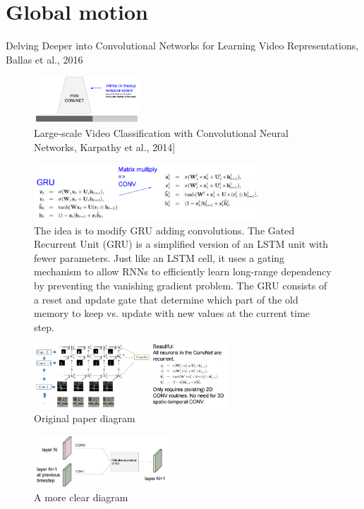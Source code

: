 \section*{Global motion}
Delving Deeper into Convolutional Networks for Learning Video Representations, Ballas et al., 2016
\begin{figure}[h]
  \centering
  \includegraphics[width=0.35\textwidth]{Images/rnn_convnet/3.png}
  \caption{Large-scale Video Classification with Convolutional Neural Networks, Karpathy et al., 2014]}
\end{figure}
\begin{figure}[h]
  \centering
  \includegraphics[width=0.75\textwidth]{Images/rnn_convnet/6.png}
  \caption{The idea is to modify GRU adding convolutions. The Gated Recurrent Unit (GRU) is a simplified version of an LSTM unit with fewer parameters. Just like an LSTM cell, it uses a gating mechanism to allow RNNs to efficiently learn long-range dependency by preventing the vanishing gradient problem. The GRU consists of a reset and update gate that determine which part of the old memory to keep vs. update with new values at the current time step.}
\end{figure}
\begin{figure}[h]
  \centering
  \includegraphics[width=0.65\textwidth]{Images/rnn_convnet/5.png}
  \caption{Original paper diagram}
\end{figure}
\begin{figure}[h]
  \centering
  \includegraphics[width=0.45\textwidth]{Images/rnn_convnet/4.png}
  \caption{A more clear diagram}
\end{figure}

